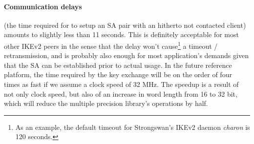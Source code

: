 \documentclass[final,a4paper,twoside,11pt,onecolumn]{report}
\begin{document}
\paragraph{Communication delays} (the time required for to setup an SA pair with an hitherto not contacted client) amounts to slightly less than 11 seconds. This is definitely acceptable for most other IKEv2 peers in the sense that the delay won't cause\footnote{As an example, the default timeout for Strongswan's IKEv2 daemon \emph{charon} is 120 seconds.} a timeout / retransmission, and is probably also enough for most application's demands given that the SA can be established prior to actual usage. In the future reference platform, the time required by the key exchange will be on the order of four times as fast if we assume a clock speed of 32 MHz. The speedup is a result of not only clock speed, but also of an increase in word length from 16 to 32 bit, which will reduce the multiple precision library's operations by half.


% 
% 
% 
% 
% 
% 
% 

%    
% 
% 
\end{document}
